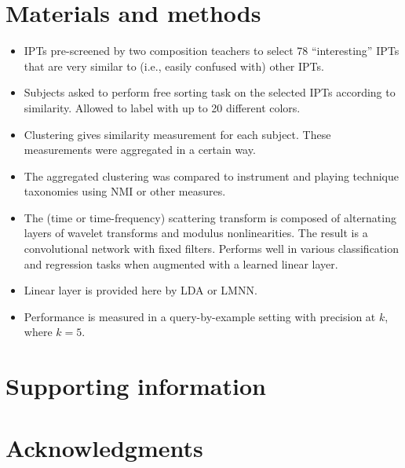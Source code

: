 \documentclass[10pt,letterpaper]{article}
\begin{document}
\section*{Materials and methods}
\label{sec:methods}

\begin{itemize}
\item IPTs pre-screened by two composition teachers to select 78 ``interesting'' IPTs that are very similar to (i.e., easily confused with) other IPTs.
\item Subjects asked to perform free sorting task on the selected IPTs according to similarity. Allowed to label with up to 20 different colors.
\item Clustering gives similarity measurement for each subject. These measurements were aggregated in a certain way.
\item The aggregated clustering was compared to instrument and playing technique taxonomies using NMI or other measures.
\item The (time or time-frequency) scattering transform is composed of alternating layers of wavelet transforms and modulus nonlinearities. The result is a convolutional network with fixed filters. Performs well in various classification and regression tasks when augmented with a learned linear layer.
\item Linear layer is provided here by LDA or LMNN.
\item Performance is measured in a query-by-example setting with precision at $k$, where $k = 5$.
\end{itemize}

\section*{Supporting information}
\label{sec:supp}

\section*{Acknowledgments}
\label{sec:ack}

\nolinenumbers



\end{document}
